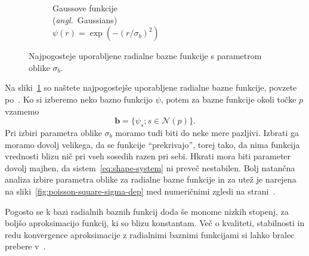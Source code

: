 \documentclass[12pt,a4paper,twoside]{article}
\theoremstyle{definition} %
\theoremstyle{plain} %
\numberwithin{equation}{section}
\newcommand{\Nc}{\mathcal{N}}
\renewcommand{\b}{\boldsymbol}
\newcommand{\ang}[1]{(\hspace{-1.5px}\textit{angl.}\ #1)}
\begin{document}
\begin{figure}[h]
\begin{subfigure}[t]{0.32\textwidth}
    \caption[Gaussove funkcije]{Gaussove funkcije \\ \ang{Gaussians} \\ $\psi(r) = \exp(-(r/\sigma_b)^2)$}
  \end{subfigure}
  \caption[Najpogosteje uporabljene radialne bazne funkcije]{Najpogosteje uporabljene radialne bazne
  funkcije s parametrom oblike $\sigma_b$.}
  \label{fig:rbf}
\end{figure}



Na sliki~\ref{fig:rbf} so naštete najpogostejše uporabljene radialne bazne funkcije, povzete
po~\cite[str.\ 5]{schaback1995error}.
Ko si izberemo neko bazno funkcijo $\psi$, potem za bazne funkcije okoli točke
$p$ vzamemo
\begin{equation}
   \b b = \{\psi_s; s \in \Nc(p) \}.
\end{equation}
Pri izbiri parametra oblike $\sigma_b$ moramo tudi biti do neke mere pazljivi. Izbrati
ga moramo dovolj velikega, da se funkcije ``prekrivajo'', torej tako, da nima
funkcija vrednosti blizu nič pri vseh sosedih razen pri sebi. Hkrati mora biti
parameter dovolj majhen, da sistem~\eqref{eq:shape-system} ni preveč nestabilen.
Bolj natančna analiza izbire parametra oblike za radialne bazne funkcije in
za utež je narejena na sliki~\ref{fig:poisson-square-sigma-dep} med numeričnimi
zgledi na strani~\pageref{fig:poisson-square-sigma-dep}.

Pogosto se k bazi radialnih baznih funkcij doda še monome nizkih stopenj, za
boljšo aproksimacijo funkcij, ki so blizu konstantam. Več o kvaliteti,
stabilnosti in redu konvergence aproksimacije z radialnimi baznimi funkcijami
si lahko bralec prebere v~\cite{buhmann2000radial}.
\end{document}
